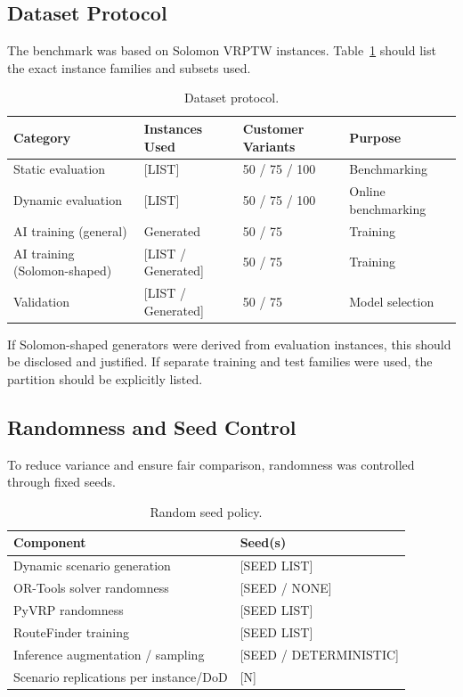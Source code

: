 \subsection{Dataset Protocol}

The benchmark was based on Solomon VRPTW instances. Table~\ref{tab:dataset}
should list the exact instance families and subsets used.

\begin{table}[H]
\centering
\caption{Dataset protocol.}
\label{tab:dataset}
\begin{tabular}{llll}
\toprule
Category & Instances Used & Customer Variants & Purpose \\
\midrule
Static evaluation & [LIST] & 50 / 75 / 100 & Benchmarking \\
Dynamic evaluation & [LIST] & 50 / 75 / 100 & Online benchmarking \\
AI training (general) & Generated & 50 / 75 & Training \\
AI training (Solomon-shaped) & [LIST / Generated] & 50 / 75 & Training \\
Validation & [LIST / Generated] & 50 / 75 & Model selection \\
\bottomrule
\end{tabular}
\end{table}

If Solomon-shaped generators were derived from evaluation instances, this should
be disclosed and justified. If separate training and test families were used,
the partition should be explicitly listed.

\subsection{Randomness and Seed Control}

To reduce variance and ensure fair comparison, randomness was controlled through
fixed seeds.

\begin{table}[H]
\centering
\caption{Random seed policy.}
\label{tab:seeds}
\begin{tabular}{ll}
\toprule
Component & Seed(s) \\
\midrule
Dynamic scenario generation & [SEED LIST] \\
OR-Tools solver randomness & [SEED / NONE] \\
PyVRP randomness & [SEED LIST] \\
RouteFinder training & [SEED LIST] \\
Inference augmentation / sampling & [SEED / DETERMINISTIC] \\
Scenario replications per instance/DoD & [N] \\
\bottomrule
\end{tabular}
\end{table}

